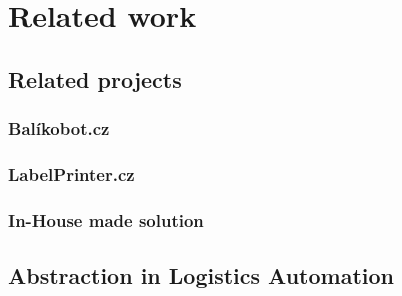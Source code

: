 \chapter{Related work}
\label{chap:related-work}
\section{Related projects}
\label{sec:related-projects}

\subsection{Balíkobot.cz}
\label{subsec:balikobot}
\subsection{LabelPrinter.cz}
\label{subsec:labelprinter}
\subsection{In-House made solution}
\label{subsec:in-house-made-solution}
\section{Abstraction in Logistics Automation}
\label{sec:abstraction-in-logistics-automation}
